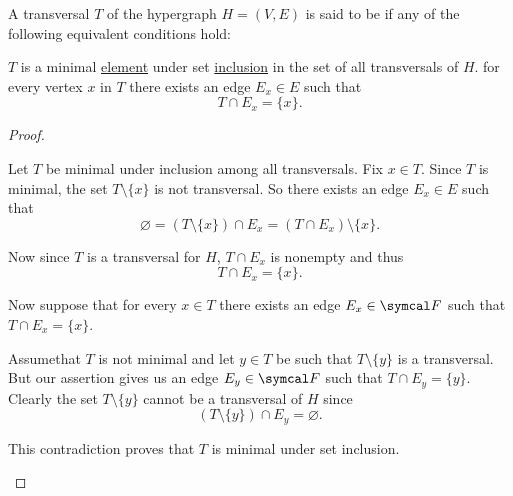 \begin{definition}\label{def:minimal_hypergraph_transversal}
  A transversal \( T \) of the hypergraph \( H = (V, E) \) is said to be  if any of the following equivalent conditions hold:
  \begin{defenum}
     \( T \) is a minimal \hyperref[def:preordered_set/maximal_minimal_element]{element} under set \hyperref[remark:subset_and_membership_relations]{inclusion} in the set of all transversals of \( H \).
     for every vertex \( x \) in \( T \) there exists an edge \( E_x \in E \) such that
    \begin{equation*}
      T \cap E_x = \{ x \}.
    \end{equation*}
  \end{defenum}
\end{definition}
\begin{proof}\mbox{}
  \begin{description}
     Let \( T \) be minimal under inclusion among all transversals. Fix \( x \in T \). Since \( T \) is minimal, the set \( T \setminus \{ x \} \) is not transversal. So there exists an edge \( E_x \in E \) such that
    \begin{equation*}
      \varnothing = (T \setminus \{ x \}) \cap E_x = (T \cap E_x) \setminus \{ x \}.
    \end{equation*}

    Now since \( T \) is a transversal for \( H \), \( T \cap E_x \) is nonempty and thus
    \begin{equation*}
      T \cap E_x = \{ x \}.
    \end{equation*}

     Now suppose that for every \( x \in T \) there exists an edge \( E_x \in \Cal{F} \) such that \( T \cap E_x = \{ x \} \).

    Assume\LEM that \( T \) is not minimal and let \( y \in T \) be such that \( T \setminus \{ y \} \) is a transversal. But our assertion gives us an edge \( E_y \in \Cal{F} \) such that \( T \cap E_y = \{ y \} \). Clearly the set \( T \setminus \{ y \} \) cannot be a transversal of \( H \) since
    \begin{equation*}
      (T \setminus \{ y \}) \cap E_y = \varnothing.
    \end{equation*}

    This contradiction proves that \( T \) is minimal under set inclusion.
  \end{description}
\end{proof}

